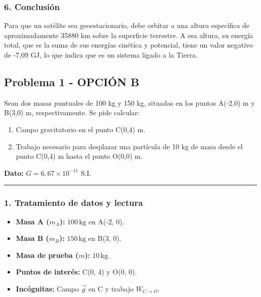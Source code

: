 \subsubsection*{6. Conclusión}
\begin{cajaconclusion}
Para que un satélite sea geoestacionario, debe orbitar a una altura específica de aproximadamente 35880 km sobre la superficie terrestre. A esa altura, su energía total, que es la suma de sus energías cinética y potencial, tiene un valor negativo de -7,09 GJ, lo que indica que es un sistema ligado a la Tierra.
\end{cajaconclusion}

\newpage

\subsection{Problema 1 - OPCIÓN B}
\label{subsec:1B_2000_sep_ext}

\begin{cajaenunciado}
Sean dos masas puntuales de 100 kg y 150 kg, situadas en los puntos A(-2,0) m y B(3,0) m, respectivamente. Se pide calcular:
\begin{enumerate}
    \item Campo gravitatorio en el punto C(0,4) m.
    \item Trabajo necesario para desplazar una partícula de 10 kg de masa desde el punto C(0,4) m hasta el punto O(0,0) m.
\end{enumerate}
\textbf{Dato:} $G=6,67\times10^{-11}$ S.I.
\end{cajaenunciado}
\hrule

\subsubsection*{1. Tratamiento de datos y lectura}
\begin{itemize}
    \item \textbf{Masa A ($m_A$):} $100 \, \text{kg}$ en A(-2, 0).
    \item \textbf{Masa B ($m_B$):} $150 \, \text{kg}$ en B(3, 0).
    \item \textbf{Masa de prueba ($m$):} $10 \, \text{kg}$.
    \item \textbf{Puntos de interés:} C(0, 4) y O(0, 0).
    \item \textbf{Incógnitas:} Campo $\vec{g}$ en C y trabajo $W_{C \to O}$.
\end{itemize}

